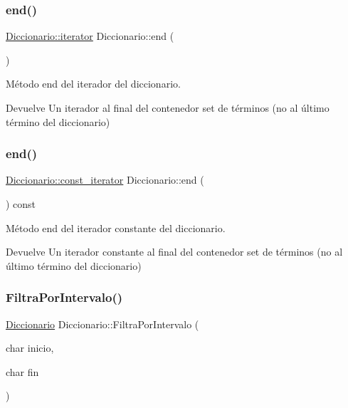 \subsubsection{\texorpdfstring{end()}{end()}\hspace{0.1cm}{\footnotesize\ttfamily [1/2]}}
{\footnotesize\ttfamily \hyperlink{classDiccionario_a91820df8d3ba094a119e4ad5af589156}{Diccionario\+::iterator} Diccionario\+::end (\begin{DoxyParamCaption}{ }\end{DoxyParamCaption})}



Método end del iterador del diccionario. 

\begin{DoxyReturn}{Devuelve}
Un iterador al final del contenedor set de términos (no al último término del diccionario) 
\end{DoxyReturn}
\mbox{\label{classDiccionario_a8161ae4e92a33e516bf73741e8299846}} 
\subsubsection{\texorpdfstring{end()}{end()}\hspace{0.1cm}{\footnotesize\ttfamily [2/2]}}
{\footnotesize\ttfamily \hyperlink{classDiccionario_a2e86a5840e62eab4f1499c2f23561cba}{Diccionario\+::const\+\_\+iterator} Diccionario\+::end (\begin{DoxyParamCaption}{ }\end{DoxyParamCaption}) const}



Método end del iterador constante del diccionario. 

\begin{DoxyReturn}{Devuelve}
Un iterador constante al final del contenedor set de términos (no al último término del diccionario) 
\end{DoxyReturn}
\mbox{\label{classDiccionario_a0b6e19ef8a378f77d9411e4a873a1d76}} 
\subsubsection{\texorpdfstring{Filtra\+Por\+Intervalo()}{FiltraPorIntervalo()}}
{\footnotesize\ttfamily \hyperlink{classDiccionario}{Diccionario} Diccionario\+::\+Filtra\+Por\+Intervalo (\begin{DoxyParamCaption}\item[{char}]{inicio,  }\item[{char}]{fin }\end{DoxyParamCaption})}



